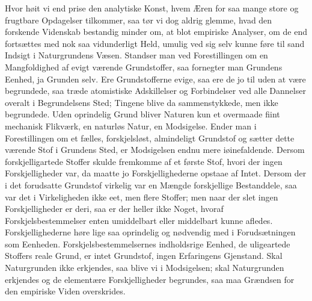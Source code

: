 \documentclass[12pt,a4paper]{book}
\begin{document}
Hvor høit vi end prise den analytiske Konst, hvem Æren for saa mange store
og frugtbare Opdagelser tilkommer,
saa tør vi dog aldrig glemme, hvad den forskende Videnskab bestandig
minder om, at blot empiriske Analyser, om de end fortsættes med nok saa
vidunderligt Held, umulig ved sig selv kunne føre til sand Indsigt i
Naturgrundens Væsen. Standser man ved Forestillingen om en Mangfoldighed
af evigt værende Grundstoffer, saa fornegter man Grundens Eenhed, ja
Grunden selv. Ere Grundstofferne evige, saa ere de jo til uden at være
begrundede, saa træde atomistiske Adskillelser og Forbindelser ved alle
Dannelser overalt i Begrundelsens Sted; Tingene blive da sammenstykkede,
men ikke begrundede. Uden oprindelig Grund bliver Naturen kun et overmaade
fiint mechanisk Flikværk, en naturløs Natur, en Modsigelse. Ender man i
Forestillingen om et fælles, forskjelsløst, almindeligt Grundstof og
sætter dette værende Stof i Grundens Sted, er Modsigelsen endnu mere
iøinefaldende. Dersom forskjelligartede Stoffer skulde fremkomme af et
første Stof, hvori der ingen Forskjelligheder var, da maatte jo
Forskjellighederne opstaae af Intet. Dersom der i det forudsatte Grundstof
virkelig var en Mængde forskjellige Bestanddele, saa var det i
Virkeligheden ikke eet, men flere Stoffer; men naar der slet ingen
Forskjelligheder er deri, saa er der heller ikke Noget, hvoraf
Forskjelsbestemmelser enten umiddelbart eller middelbart kunne afledes.
Forskjellighederne høre lige saa oprindelig og nødvendig med i
Forudsætningen som Eenheden. Forskjelsbestemmelsernes indholdsrige Eenhed,
de uligeartede Stoffers reale Grund, er intet Grundstof, ingen Erfaringens
Gjenstand. Skal Naturgrunden ikke erkjendes, saa blive vi i Modsigelsen;
skal Naturgrunden erkjendes og de elementære Forskjelligheder begrundes,
saa maa Grændsen for den empiriske Viden overskrides.
\end{document}
